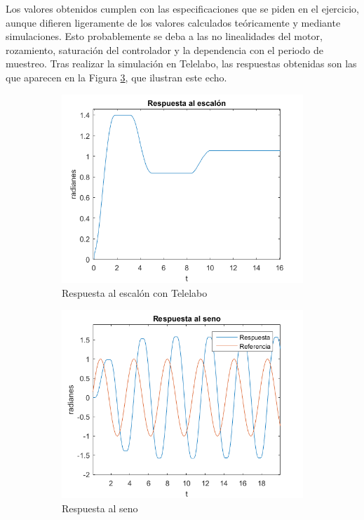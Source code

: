 \documentclass[a4paper]{article}
\begin{document}
Los valores obtenidos cumplen con las especificaciones que se piden en el ejercicio, aunque difieren ligeramente de los valores calculados teóricamente y mediante simulaciones. Esto probablemente se deba a las no linealidades del motor, rozamiento, saturación del controlador y la dependencia con el periodo de muestreo. Tras realizar la simulación en Telelabo, las respuestas obtenidas son las que aparecen en la Figura \ref{real}, que ilustran este echo.


\begin{center}
	\begin{figure}[htp]
		\begin{subfigure}{1\textwidth}
			\centering
			\includegraphics[width=12cm]{respuesta_labo}
			\caption{Respuesta al escalón con Telelabo}
			\label{escalonreal}
		\end{subfigure}
		
		\begin{subfigure}{1\textwidth}
			\centering
			\includegraphics[width=12cm]{respuesta_seno}
			\caption{Respuesta al seno}
			\label{seno}
		\end{subfigure}
		\caption{}
		\label{real}
	\end{figure}
\end{center}
\end{document}
